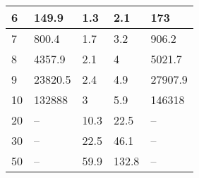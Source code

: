 \begin{table}[h]
\begin{tabular}{||l|llll||}
    6          & 149.9                                                             & 1.3                                                               & 2.1                                                                       & 173                                                                        \\ \hline
    7          & 800.4                                                             & 1.7                                                               & 3.2                                                                       & 906.2                                                                      \\ \hline
    8          & 4357.9                                                            & 2.1                                                               & 4                                                                         & 5021.7                                                                     \\ \hline
    9          & 23820.5                                                           & 2.4                                                               & 4.9                                                                       & 27907.9                                                                    \\ \hline
    10         & 132888                                                            & 3                                                                 & 5.9                                                                       & 146318                                                                     \\ \hline
    20         & --                                                                & 10.3                                                              & 22.5                                                                      & --                                                                         \\ \hline
    30         & --                                                                & 22.5                                                              & 46.1                                                                      & --                                                                         \\ \hline
    50         & --                                                                & 59.9                                                              & 132.8                                                                     & --                                                                         \\ \hline

\end{tabular}
\end{table}
